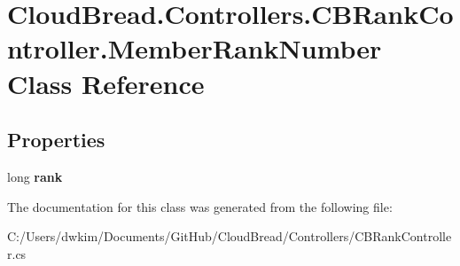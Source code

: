 \hypertarget{a00079}{}\section{Cloud\+Bread.\+Controllers.\+C\+B\+Rank\+Controller.\+Member\+Rank\+Number Class Reference}
\label{a00079}
\subsection*{Properties}
\begin{DoxyCompactItemize}
\item 
long {\bfseries rank}\hypertarget{a00079_ab74cd85bb8f59654b489aacfb24423ca}{}\label{a00079_ab74cd85bb8f59654b489aacfb24423ca}

\end{DoxyCompactItemize}


The documentation for this class was generated from the following file\+:\begin{DoxyCompactItemize}
\item 
C\+:/\+Users/dwkim/\+Documents/\+Git\+Hub/\+Cloud\+Bread/\+Controllers/C\+B\+Rank\+Controller.\+cs\end{DoxyCompactItemize}

